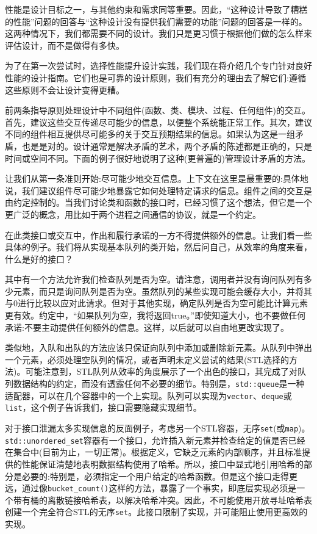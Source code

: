 
性能是设计目标之一，与其他约束和需求同等重要。因此，“这种设计导致了糟糕的性能”问题的回答与“这种设计没有提供我们需要的功能”问题的回答是一样的。这两种情况下，我们都需要不同的设计。我们只是更习惯于根据他们做的怎么样来评估设计，而不是做得有多快。

为了在第一次尝试时，选择性能提升设计实践，我们现在将介绍几个专门针对良好性能的设计指南。它们也是可靠的设计原则，我们有充分的理由去了解它们:遵循这些原则不会让设计变得更糟。 

前两条指导原则处理设计中不同组件(函数、类、模块、过程、任何组件)的交互。首先，建议这些交互传递尽可能少的信息，以便整个系统能正常工作。其次，建议不同的组件相互提供尽可能多的关于交互预期结果的信息。如果认为这是一组矛盾，也是是对的。设计通常是解决矛盾的艺术，两个矛盾的陈述都是正确的，只是时间或空间不同。下面的例子很好地说明了这种(更普遍的)管理设计矛盾的方法。


让我们从第一条准则开始:尽可能少地交互信息。上下文在这里是最重要的:具体地说，我们建议组件尽可能少地暴露它如何处理特定请求的信息。组件之间的交互是由约定控制的。当我们讨论类和函数的接口时，已经习惯了这个想法，但它是一个更广泛的概念，用比如于两个进程之间通信的协议，就是一个约定。 

在此类接口或交互中，作出和履行承诺的一方不得提供额外的信息。让我们看一些具体的例子。我们将从实现基本队列的类开始，然后问自己，从效率的角度来看，什么是好的接口？

其中有一个方法允许我们检查队列是否为空。请注意，调用者并没有询问队列有多少元素，而只是询问队列是否为空。虽然队列的某些实现可能会缓存大小，并将其与0进行比较以应对此请求。但对于其他实现，确定队列是否为空可能比计算元素更有效。约定中，“如果队列为空，我将返回true。”即使知道大小，也不要做任何承诺:不要主动提供任何额外的信息。这样，以后就可以自由地更改实现了。 

类似地，入队和出队的方法应该只保证向队列中添加或删除新元素。从队列中弹出一个元素，必须处理空队列的情况，或者声明未定义尝试的结果(STL选择的方法)。可能注意到，STL队列从效率的角度展示了一个出色的接口，其完成了对队列数据结构的约定，而没有透露任何不必要的细节。特别是，\texttt{std::queue}是一种适配器，可以在几个容器中的一个上实现。队列可以实现为\texttt{vector}、\texttt{deque}或\texttt{list}，这个例子告诉我们，接口需要隐藏实现细节。

对于接口泄漏太多实现信息的反面例子，考虑另一个STL容器，无序\texttt{set}(或\texttt{map})。\texttt{std::unor\break dered\_set}容器有一个接口，允许插入新元素并检查给定的值是否已经在集合中(目前为止，一切正常)。根据定义，它缺乏元素的内部顺序，并且标准提供的性能保证清楚地表明数据结构使用了哈希。所以，接口中显式地引用哈希的部分是必要的:特别是，必须指定一个用户给定的哈希函数。但是这个接口走得更远，通过像\texttt{bucket\_count()}这样的方法，暴露了一个事实，即底层实现必须是一个带有桶的离散链接哈希表，以解决哈希冲突。因此，不可能使用开放寻址哈希表创建一个完全符合STL的无序\texttt{set}。此接口限制了实现，并可能阻止使用更高效的实现。

